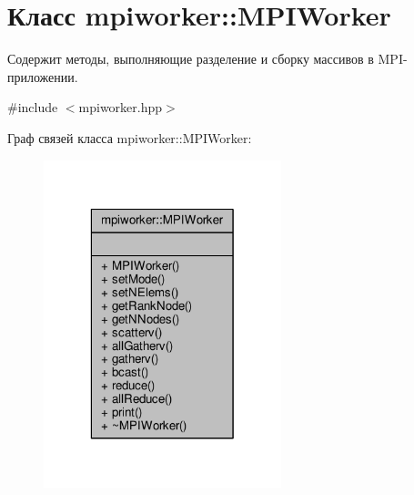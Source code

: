 \hypertarget{classmpiworker_1_1MPIWorker}{\section{Класс mpiworker\-:\-:M\-P\-I\-Worker}
\label{classmpiworker_1_1MPIWorker}
}


Содержит методы, выполняющие разделение и сборку массивов в M\-P\-I-\/приложении.  




{\ttfamily \#include $<$mpiworker.\-hpp$>$}



Граф связей класса mpiworker\-:\-:M\-P\-I\-Worker\-:\nopagebreak
\begin{figure}[H]
\begin{center}
\leavevmode
\includegraphics[width=196pt]{classmpiworker_1_1MPIWorker__coll__graph}
\end{center}
\end{figure}
